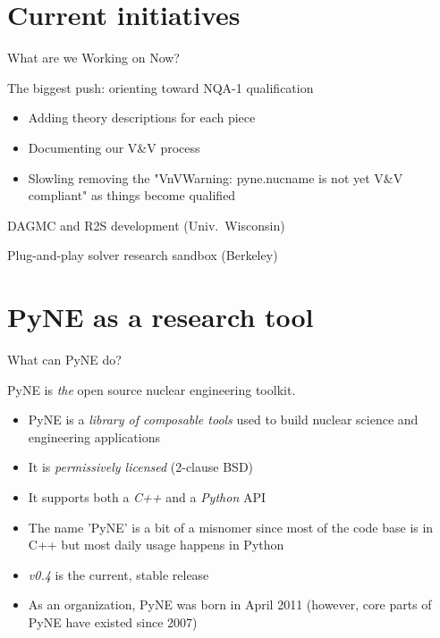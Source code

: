 \documentclass[xcolor=x11names,compress]{beamer}
\renewcommand{\(}{\begin{columns}}
\renewcommand{\)}{\end{columns}}
\newcommand{\<}[1]{\begin{column}{#1}}
\renewcommand{\>}{\end{column}}
\begin{document}
\section{Current initiatives}
\begin{frame}{What are we Working on Now?}

    The biggest push: orienting toward NQA-1 qualification \cite{pyne_vnv}
    \begin{itemize}
    \item Adding theory descriptions for each piece
    \item Documenting our V\&V process
    \item Slowling removing the "VnVWarning: pyne.nucname is not yet V\&V compliant" as
    things become qualified
    \end{itemize}

    \vspace*{1 em}
    DAGMC and R2S development (\textcolor{cardinal}{Univ.\ Wisconsin})
    
    \vspace*{1 em}
    Plug-and-play solver research sandbox (\textcolor{byellow}{Berkeley})
    
\end{frame}

\section{PyNE as a research tool}
\begin{frame}{What can PyNE do?}

    PyNE is \textit{the} open source nuclear engineering toolkit.
    \vspace*{1em}
    \begin{itemize}
    \item PyNE is a \textit{library of composable tools} used to build 
    nuclear science and engineering applications
    \item It is \textit{permissively licensed} (2-clause BSD)
    \item It supports both a \textit{C++} and a \textit{Python} API
    \item The name 'PyNE' is a bit of a misnomer since most of the code 
    base is in C++ but most daily usage happens in Python
    \item \textit{v0.4} is the current, stable release
    \item As an organization, PyNE was born in April 2011 
    (however, core parts of PyNE have existed since 2007)
    \end{itemize}

\end{frame}
\end{document}
